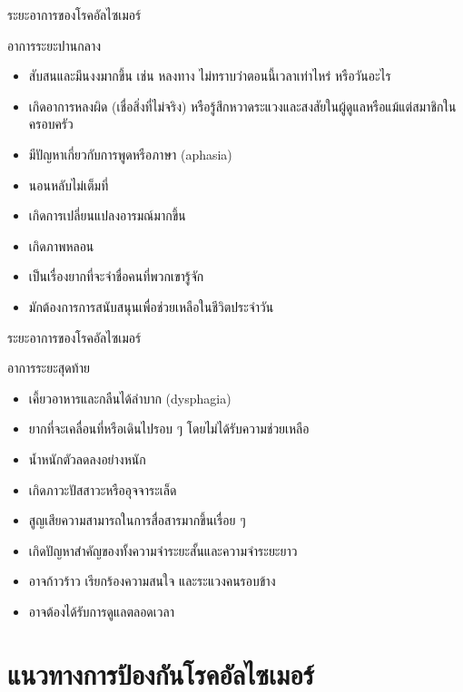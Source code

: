 \documentclass[xetex,serif]{beamer}
\begin{document}
\begin{frame}{ระยะอาการของโรคอัลไซเมอร์}

{\Large อาการระยะปานกลาง}

\begin{itemize}
  \item สับสนและมึนงงมากขึ้น เช่น หลงทาง ไม่ทราบว่าตอนนี้เวลาเท่าไหร่ หรือวันอะไร 
  \item เกิดอาการหลงผิด (เชื่อสิ่งที่ไม่จริง)  หรือรู้สึกหวาดระแวงและสงสัยในผู้ดูแลหรือแม้แต่สมาชิกในครอบครัว 
  \item มีปัญหาเกี่ยวกับการพูดหรือภาษา (aphasia) 
  \item นอนหลับไม่เต็มที่ 
  \item เกิดการเปลี่ยนแปลงอารมณ์มากขึ้น 
  \item เกิดภาพหลอน 
  \item เป็นเรื่องยากที่จะจำชื่อคนที่พวกเขารู้จัก 
  \item มักต้องการการสนับสนุนเพื่อช่วยเหลือในชีวิตประจำวัน
\end{itemize}
\end{frame}

\begin{frame}{ระยะอาการของโรคอัลไซเมอร์}

{\Large อาการระยะสุดท้าย}

\begin{itemize}
  \item เคี้ยวอาหารและกลืนได้ลำบาก (dysphagia)
  \item ยากที่จะเคลื่อนที่หรือเดินไปรอบ ๆ โดยไม่ได้รับความช่วยเหลือ
  \item น้ำหนักตัวลดลงอย่างหนัก
  \item เกิดภาวะปัสสาวะหรืออุจจาระเล็ด
  \item สูญเสียความสามารถในการสื่อสารมากขึ้นเรื่อย ๆ
  \item เกิดปัญหาสำคัญของทั้งความจำระยะสั้นและความจำระยะยาว
  \item อาจก้าวร้าว เรียกร้องความสนใจ และระแวงคนรอบข้าง
  \item อาจต้องได้รับการดูแลตลอดเวลา
\end{itemize}
\end{frame}

\section{แนวทางการป้องกันโรคอัลไซเมอร์}
\end{document}
